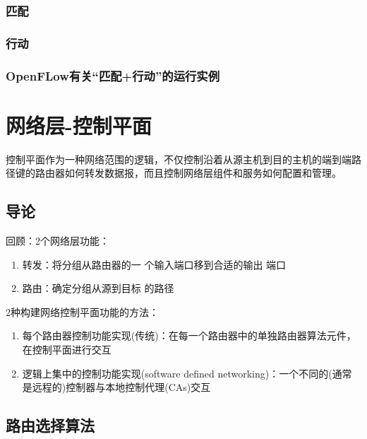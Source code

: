 \documentclass[]{report}
\begin{document}
		\subsection{匹配}
		\subsection{行动}
		\subsection{OpenFLow有关“匹配+行动”的运行实例}

	\chapter{网络层-控制平面}
	控制平面作为一种网络范围的逻辑，不仅控制沿着从源主机到目的主机的端到端路径键的路由器如何转发数据报，而且控制网络层组件和服务如何配置和管理。
	\section{导论}
	回顾：2个网络层功能：
	\begin{enumerate}
		\item 转发：将分组从路由器的一 个输入端口移到合适的输出 端口
		\item 路由：确定分组从源到目标 的路径
	\end{enumerate}
	2种构建网络控制平面功能的方法：
	\begin{enumerate}
		\item 每个路由器控制功能实现(传统)：在每一个路由器中的单独路由器算法元件，在控制平面进行交互
		\item 逻辑上集中的控制功能实现(software defined networking)：一个不同的(通常是远程的)控制器与本地控制代理(CAs)交互
	\end{enumerate}
	\section{路由选择算法}
\end{document}
